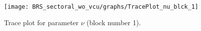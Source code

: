 \begin{figure}[H]
\centering
  \texttt{[image: BRS\_sectoral\_wo\_vcu/graphs/TracePlot\_nu\_blck\_1]}\\
    \caption{Trace plot for parameter $\nu$ (block number 1).}
\end{figure}
